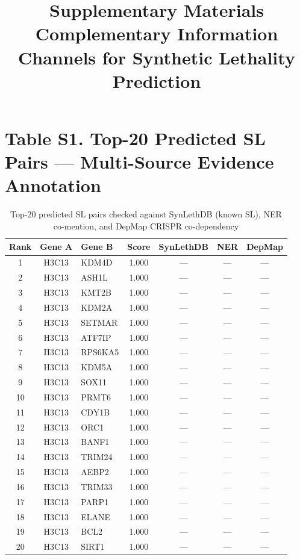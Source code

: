 \documentclass[12pt,a4paper]{article}
\begin{document}
\title{\textbf{Supplementary Materials}\\[5pt]
\large Complementary Information Channels for Synthetic Lethality Prediction}
\author{}
\date{}

\maketitle

\vspace{-10mm}

\section*{Table S1. Top-20 Predicted SL Pairs --- Multi-Source Evidence Annotation}

\begin{table}[ht]
\centering
\caption{Top-20 predicted SL pairs checked against SynLethDB (known SL), NER co-mention, and DepMap CRISPR co-dependency}
\label{tab:s1}
\small
\begin{tabular}{cclcccc}
\toprule
\textbf{Rank} & \textbf{Gene A} & \textbf{Gene B} & \textbf{Score} & \textbf{SynLethDB} & \textbf{NER} & \textbf{DepMap} \\
\midrule
1 & H3C13 & KDM4D & 1.000 & --- & --- & --- \\
2 & H3C13 & ASH1L & 1.000 & --- & --- & --- \\
3 & H3C13 & KMT2B & 1.000 & --- & --- & --- \\
4 & H3C13 & KDM2A & 1.000 & --- & --- & --- \\
5 & H3C13 & SETMAR & 1.000 & --- & --- & --- \\
6 & H3C13 & ATF7IP & 1.000 & --- & --- & --- \\
7 & H3C13 & RPS6KA5 & 1.000 & --- & --- & --- \\
8 & H3C13 & KDM5A & 1.000 & --- & --- & --- \\
9 & H3C13 & SOX11 & 1.000 & --- & --- & --- \\
10 & H3C13 & PRMT6 & 1.000 & --- & --- & --- \\
11 & H3C13 & CDY1B & 1.000 & --- & --- & --- \\
12 & H3C13 & ORC1 & 1.000 & --- & --- & --- \\
13 & H3C13 & BANF1 & 1.000 & --- & --- & --- \\
14 & H3C13 & TRIM24 & 1.000 & --- & --- & --- \\
15 & H3C13 & AEBP2 & 1.000 & --- & --- & --- \\
16 & H3C13 & TRIM33 & 1.000 & --- & --- & --- \\
17 & H3C13 & PARP1 & 1.000 & --- & --- & --- \\
18 & H3C13 & ELANE & 1.000 & --- & --- & --- \\
19 & H3C13 & BCL2 & 1.000 & --- & --- & --- \\
20 & H3C13 & SIRT1 & 1.000 & --- & --- & --- \\
\bottomrule
\end{tabular}
\end{table}
\end{document}
